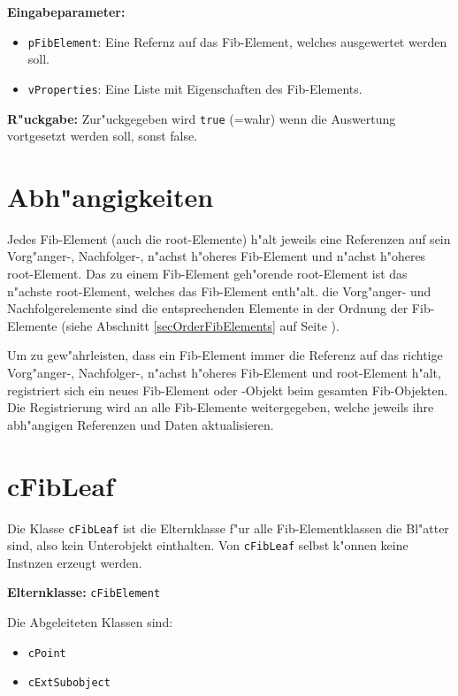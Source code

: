 \bigskip\noindent
\textbf{Eingabeparameter:}
\begin{itemize}
 \item \verb|pFibElement|: Eine Refernz auf das Fib-Element, welches ausgewertet werden soll.
 \item \verb|vProperties|: Eine Liste mit Eigenschaften des Fib-Elements.
\end{itemize}

\bigskip\noindent
\textbf{R"uckgabe:} Zur"uckgegeben wird \verb|true| (=wahr) wenn die Auswertung vortgesetzt werden soll, sonst false.



\section{Abh"angigkeiten}


Jedes Fib-Element (auch die root-Elemente) h"alt jeweils eine Referenzen auf sein Vorg"anger-, Nachfolger-, n"achst h"oheres Fib-Element und n"achst h"oheres root-Element. Das zu einem Fib-Element geh"orende root-Element ist das n"achste root-Element, welches das Fib-Element enth"alt. die Vorg"anger- und Nachfolgerelemente sind die entsprechenden Elemente in der Ordnung der Fib-Elemente (siehe Abschnitt \ref{secOrderFibElements} auf Seite \pageref{secOrderFibElements}).

Um zu gew"ahrleisten, dass ein Fib-Element immer die Referenz auf das richtige Vorg"anger-, Nachfolger-, n"achst h"oheres Fib-Element und root-Element h"alt, registriert sich ein neues Fib-Element oder -Objekt beim gesamten Fib-Objekten. Die Registrierung wird an alle Fib-Elemente weitergegeben, welche jeweils ihre abh"angigen Referenzen und Daten aktualisieren.


\section{cFibLeaf}

Die Klasse \verb|cFibLeaf| ist die Elternklasse f"ur alle Fib-Elementklassen die Bl"atter sind, also kein Unterobjekt einthalten. Von \verb|cFibLeaf| selbst k"onnen keine Instnzen erzeugt werden.

\bigskip\noindent
\textbf{Elternklasse:} \verb|cFibElement|

\bigskip\noindent
Die Abgeleiteten Klassen sind:
\begin{itemize}
 \item \verb|cPoint|
 \item \verb|cExtSubobject|
\end{itemize}


